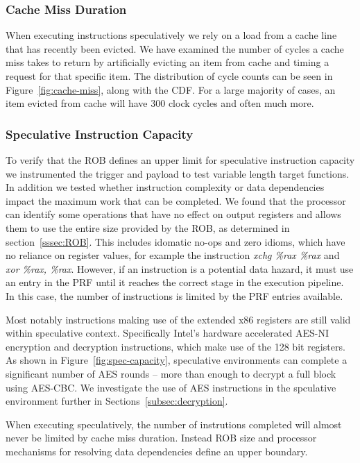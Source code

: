 \subsubsection{Cache Miss Duration}
When executing instructions speculatively we rely on a load from a cache line that
has recently been evicted. We have examined the number of cycles a
cache miss takes to return by artificially evicting an item from cache and timing 
a request for that specific item. The distribution of cycle counts can be seen in
Figure~\ref{fig:cache-miss}, along with the CDF. For a large majority of cases, 
an item evicted from cache will have 300 clock cycles and often much more. 

\subsubsection{Speculative Instruction Capacity}
To verify that the ROB defines an upper limit for speculative instruction capacity
we instrumented the trigger and payload to test variable length target functions. 
In addition we tested whether instruction complexity or data dependencies impact
the maximum work that can be completed. We found that the processor can identify 
some operations that have no effect on output registers and allows them to use the 
entire size provided by the ROB, as determined in section~\ref{sssec:ROB}. This includes 
idomatic no-ops and zero idioms, which have no reliance on register values, 
for example the instruction \textit{xchg \%rax \%rax} and \textit{xor \%rax, \%rax}. 
However, if an instruction is a potential data hazard, it must use an entry in the PRF
until it reaches the correct stage in the execution pipeline. In this case, the number 
of instructions is limited by the PRF entries available.

Most notably instructions making use of the extended x86 registers are still
valid within speculative context. Specifically Intel's hardware accelerated AES-NI
encryption and decryption instructions, which make use of the 128 bit registers.
As shown in Figure~\ref{fig:spec-capacity}, speculative environments can complete
a significant number of AES rounds -- more than enough to decrypt a full block 
using AES-CBC. We investigate the use of AES instructions in the spculative environment
further in Sections~\ref{subsec:decryption}.

\medskip

When executing speculatively, the number of instrutions completed 
will almost never be limited by cache miss duration. Instead
ROB size and processor mechanisms for resolving 
data dependencies define an upper boundary. 

